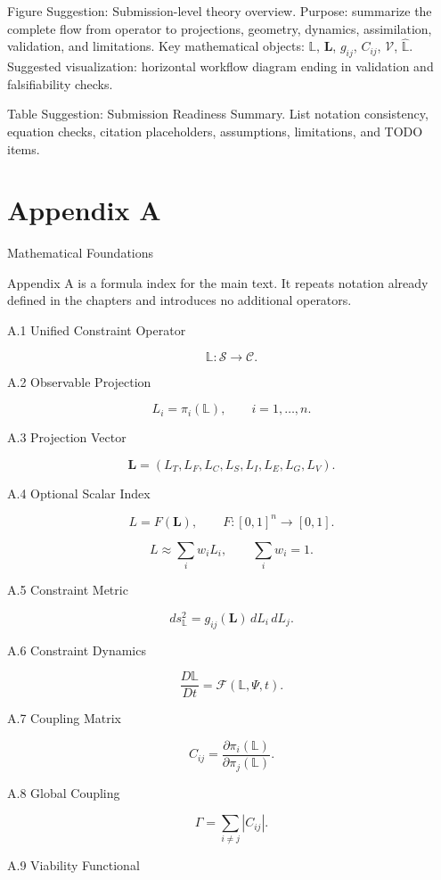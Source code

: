 \documentclass[aps,pre,reprint,superscriptaddress,nofootinbib]{revtex4-2}
\begin{document}
Figure Suggestion: Submission-level theory overview. Purpose: summarize the complete flow from operator to projections, geometry, dynamics, assimilation, validation, and limitations. Key mathematical objects: \(\mathbb{L}\), \(\mathbf{L}\), \(g_{ij}\), \(C_{ij}\), \(\mathcal{V}\), \(\hat{\mathbb{L}}\). Suggested visualization: horizontal workflow diagram ending in validation and falsifiability checks.

Table Suggestion: Submission Readiness Summary. List notation consistency, equation checks, citation placeholders, assumptions, limitations, and TODO items.

\appendix

\section{Appendix A}

Mathematical Foundations

Appendix A is a formula index for the main text. It repeats notation already defined in the chapters and introduces no additional operators.

A.1 Unified Constraint Operator

\[ \mathbb{L}:\mathcal{S}\rightarrow\mathcal{C}. \]

A.2 Observable Projection

\[ L_i=\pi_i(\mathbb{L}), \qquad i=1,\ldots,n. \]

A.3 Projection Vector

\[ \mathbf{L}=(L_T,L_F,L_C,L_S,L_I,L_E,L_G,L_V). \]

A.4 Optional Scalar Index

\[ L=F(\mathbf{L}), \qquad F:[0,1]^n\rightarrow[0,1]. \]

\[ L\approx\sum_i w_i L_i, \qquad \sum_i w_i=1. \]

A.5 Constraint Metric

\[ ds_{\mathbb{L}}^2=g_{ij}(\mathbf{L})\,dL_i\,dL_j. \]

A.6 Constraint Dynamics

\[ \frac{D\mathbb{L}}{Dt}=\mathcal{F}(\mathbb{L},\Psi,t). \]

A.7 Coupling Matrix

\[ C_{ij}=\frac{\partial \pi_i(\mathbb{L})}{\partial \pi_j(\mathbb{L})}. \]

A.8 Global Coupling

\[ \Gamma=\sum_{i\neq j}|C_{ij}|. \]

A.9 Viability Functional
\end{document}
